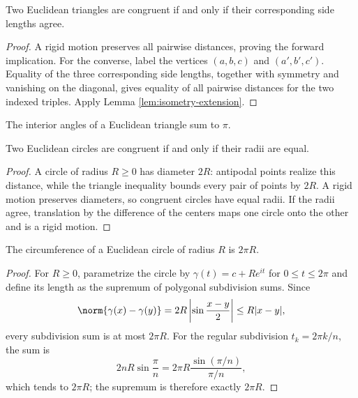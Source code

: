 \begin{theorem}
\label{thm:side-side-side}





Two Euclidean triangles are congruent if and only if their corresponding side lengths agree.
\end{theorem}
\begin{proof}
\sketch A rigid motion preserves all pairwise distances, proving the forward implication. For the
converse, label the vertices $(a,b,c)$ and $(a',b',c')$. Equality of the three corresponding side
lengths, together with symmetry and vanishing on the diagonal, gives equality of all pairwise
distances for the two indexed triples. Apply Lemma \ref{lem:isometry-extension}.
\end{proof}

\begin{theorem}
\label{thm:angle-sum-theorem}



The interior angles of a Euclidean triangle sum to $\pi$.
\end{theorem}

\begin{theorem}
\label{thm:circle-classification}





Two Euclidean circles are congruent if and only if their radii are equal.
\end{theorem}
\begin{proof}
\sketch A circle of radius $R\geq0$ has diameter $2R$: antipodal points realize this distance, while the
triangle inequality bounds every pair of points by $2R$. A rigid motion preserves diameters, so
congruent circles have equal radii. If the radii agree, translation by the difference of the centers
maps one circle onto the other and is a rigid motion.
\end{proof}

\begin{theorem}
\label{thm:circumference-theorem}




The circumference of a Euclidean circle of radius $R$ is $2\pi R$.
\end{theorem}
\begin{proof}
\sketch For $R\geq0$, parametrize the circle by $\gamma(t)=c+Re^{it}$ for $0\leq t\leq2\pi$ and define its
length as the supremum of polygonal subdivision sums. Since
\[
\norm{\gamma(x)-\gamma(y)}=2R\left|\sin\frac{x-y}{2}\right|\leq R|x-y|,
\]
every subdivision sum is at most $2\pi R$. For the regular subdivision $t_k=2\pi k/n$, the sum
is
\[
2nR\sin\frac{\pi}{n}=2\pi R\frac{\sin(\pi/n)}{\pi/n},
\]
which tends to $2\pi R$; the supremum is therefore exactly $2\pi R$.
\end{proof}

